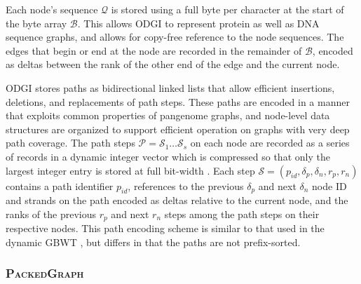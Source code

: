 \documentclass[11pt]{ucthesis}
\begin{document}
Each node's sequence $\mathcal{Q}$ is stored using a full byte per character at the start of the byte array $\mathcal{B}$.
This allows \textsc{ODGI} to represent protein as well as DNA sequence graphs, and allows for copy-free reference to the node sequences. %
The edges that begin or end at the node are recorded in the remainder of $\mathcal{B}$, encoded as deltas between the rank of the other end of the edge and the current node. 

\textsc{ODGI} stores paths as bidirectional linked lists that allow efficient insertions, deletions, and replacements of path steps.
These paths are encoded in a manner that exploits common properties of pangenome graphs, and node-level data structures are organized to support efficient operation on graphs with very deep path coverage.
The path steps $\mathcal{P} = \mathcal{S}_1 \ldots \mathcal{S}_{s}$ on each node are recorded as a series of records in a dynamic integer vector which is compressed so that only the largest integer entry is stored at full bit-width \cite{prezza2017framework}.
Each step $\mathcal{S} = (p_{id}, \delta_p, \delta_n, r_p, r_n)$ contains a path identifier $p_{id}$, references to the previous $\delta_p$ and next $\delta_n$ node ID and strands on the path encoded as deltas relative to the current node, and the ranks of the previous $r_p$ and next $r_n$ steps among the path steps on their respective nodes.
This path encoding scheme is similar to that used in the dynamic GBWT \cite{siren2020haplotype}, but differs in that the paths are not prefix-sorted.





\subsubsection{\textsc{PackedGraph}}
\end{document}
